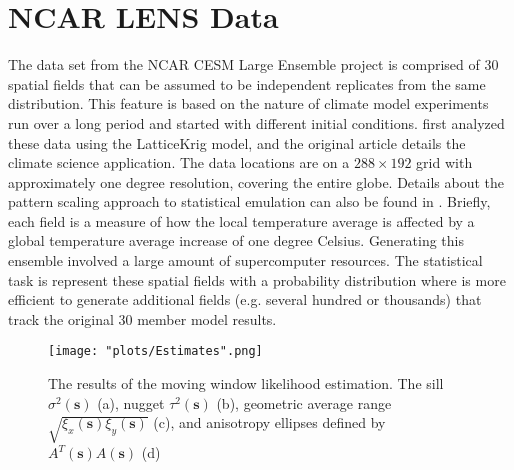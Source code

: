 \documentclass[review]{elsarticle}
\begin{document}
\begin{comment}
\section{Data analysis}

In this section, we implement the methods studied in this paper to analyze a data set where it is important to account for nonstationary covariance structure. We first use moving window likelihood estimation to infer spatially varying Mat\'ern parameters. We then translate these into their local SAR covariance parameter equivalents, and we encode the spatially varying SAR parameters into the nonstationary SAR covariance model. This model makes it possible to visualize the resulting nonstationary covariance matrix and efficiently simulate new realizations.
\end{comment}

\section{NCAR LENS Data}

The data set from the NCAR CESM Large Ensemble project \cite{kay2015community} is comprised of 30 spatial fields that can be assumed to be independent replicates from the same distribution. This feature is based on the nature of  climate model experiments run over a long period and started with different initial conditions. \citet{nychka2018modeling} first analyzed these data using the LatticeKrig model, and the original article details the climate science application. The data locations are on a $288 \times 192$ grid with approximately one degree resolution, covering the entire globe.  Details about the pattern scaling approach to statistical emulation can also be found in \cite{alexeeff2018emulating}. Briefly, each field is a measure of how the local temperature average is affected by a global temperature average increase of one degree Celsius.  Generating this ensemble involved a large amount of supercomputer resources. 
The statistical task is represent these spatial fields with a probability distribution where is more efficient to generate additional fields (e.g. several hundred or thousands) that track the original 30 member model results. 

\begin{figure}
    \centering
    \texttt{[image: "plots/Estimates".png]}
    \caption{The results of the moving window likelihood estimation. The sill $\sigma^2( \mathbf s)$ (a), nugget $\tau^2( \mathbf s)$ (b), geometric average range $\sqrt{\xi_x ( \mathbf s) \xi_y ( \mathbf s)}$ (c), and anisotropy ellipses defined by $A^T ( \mathbf s)A ( \mathbf s)$ (d)}
    \label{f:3}
\end{figure}
\end{document}
